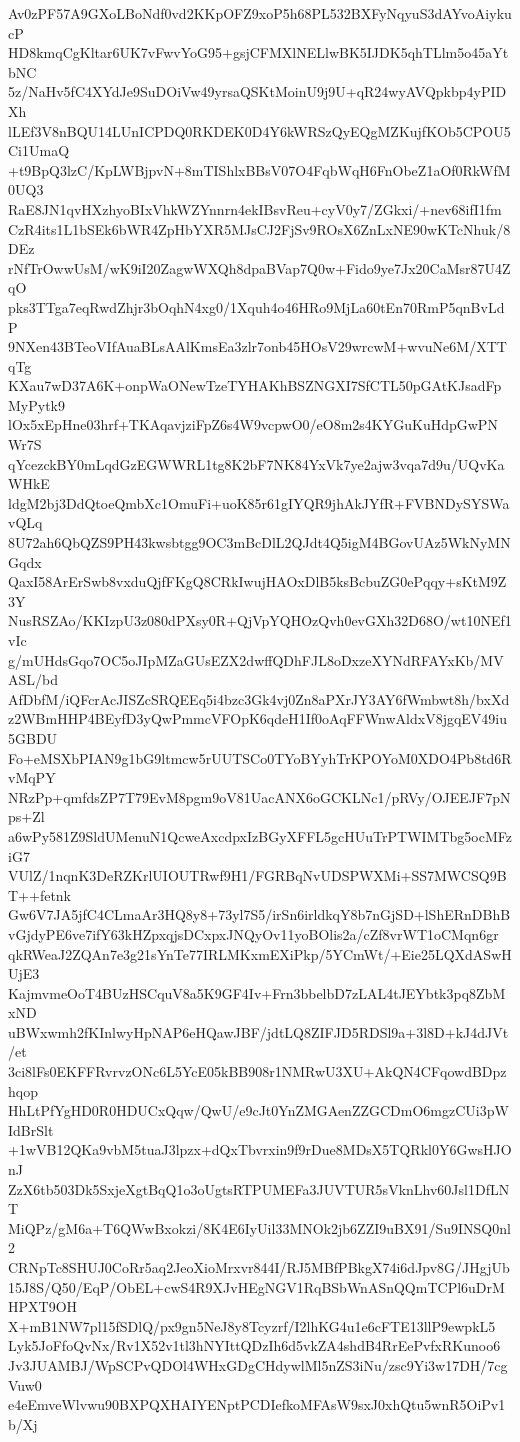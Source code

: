 Av0zPF57A9GXoLBoNdf0vd2KKpOFZ9xoP5h68PL532BXFyNqyuS3dAYvoAiykucP
HD8kmqCgKltar6UK7vFwvYoG95+gsjCFMXlNELlwBK5IJDK5qhTLlm5o45aYtbNC
5z/NaHv5fC4XYdJe9SuDOiVw49yrsaQSKtMoinU9j9U+qR24wyAVQpkbp4yPIDXh
lLEf3V8nBQU14LUnICPDQ0RKDEK0D4Y6kWRSzQyEQgMZKujfKOb5CPOU5Ci1UmaQ
+t9BpQ3lzC/KpLWBjpvN+8mTIShlxBBsV07O4FqbWqH6FnObeZ1aOf0RkWfM0UQ3
RaE8JN1qvHXzhyoBIxVhkWZYnnrn4ekIBsvReu+cyV0y7/ZGkxi/+nev68ifI1fm
CzR4its1L1bSEk6bWR4ZpHbYXR5MJsCJ2FjSv9ROsX6ZnLxNE90wKTcNhuk/8DEz
rNfTrOwwUsM/wK9iI20ZagwWXQh8dpaBVap7Q0w+Fido9ye7Jx20CaMsr87U4ZqO
pks3TTga7eqRwdZhjr3bOqhN4xg0/1Xquh4o46HRo9MjLa60tEn70RmP5qnBvLdP
9NXen43BTeoVIfAuaBLsAAlKmsEa3zlr7onb45HOsV29wrcwM+wvuNe6M/XTTqTg
KXau7wD37A6K+onpWaONewTzeTYHAKhBSZNGXI7SfCTL50pGAtKJsadFpMyPytk9
lOx5xEpHne03hrf+TKAqavjziFpZ6s4W9vcpwO0/eO8m2s4KYGuKuHdpGwPNWr7S
qYcezckBY0mLqdGzEGWWRL1tg8K2bF7NK84YxVk7ye2ajw3vqa7d9u/UQvKaWHkE
ldgM2bj3DdQtoeQmbXc1OmuFi+uoK85r61gIYQR9jhAkJYfR+FVBNDySYSWavQLq
8U72ah6QbQZS9PH43kwsbtgg9OC3mBcDlL2QJdt4Q5igM4BGovUAz5WkNyMNGqdx
QaxI58ArErSwb8vxduQjfFKgQ8CRkIwujHAOxDlB5ksBcbuZG0ePqqy+sKtM9Z3Y
NusRSZAo/KKIzpU3z080dPXsy0R+QjVpYQHOzQvh0evGXh32D68O/wt10NEf1vIc
g/mUHdsGqo7OC5oJIpMZaGUsEZX2dwffQDhFJL8oDxzeXYNdRFAYxKb/MVASL/bd
AfDbfM/iQFcrAcJISZcSRQEEq5i4bzc3Gk4vj0Zn8aPXrJY3AY6fWmbwt8h/bxXd
z2WBmHHP4BEyfD3yQwPmmcVFOpK6qdeH1If0oAqFFWnwAldxV8jgqEV49iu5GBDU
Fo+eMSXbPIAN9g1bG9ltmcw5rUUTSCo0TYoBYyhTrKPOYoM0XDO4Pb8td6RvMqPY
NRzPp+qmfdsZP7T79EvM8pgm9oV81UacANX6oGCKLNc1/pRVy/OJEEJF7pNps+Zl
a6wPy581Z9SldUMenuN1QcweAxcdpxIzBGyXFFL5gcHUuTrPTWIMTbg5ocMFziG7
VUlZ/1nqnK3DeRZKrlUIOUTRwf9H1/FGRBqNvUDSPWXMi+SS7MWCSQ9BT++fetnk
Gw6V7JA5jfC4CLmaAr3HQ8y8+73yl7S5/irSn6irldkqY8b7nGjSD+lShERnDBhB
vGjdyPE6ve7ifY63kHZpxqjsDCxpxJNQyOv11yoBOlis2a/cZf8vrWT1oCMqn6gr
qkRWeaJ2ZQAn7e3g21sYnTe77IRLMKxmEXiPkp/5YCmWt/+Eie25LQXdASwHUjE3
KajmvmeOoT4BUzHSCquV8a5K9GF4Iv+Frn3bbelbD7zLAL4tJEYbtk3pq8ZbMxND
uBWxwmh2fKInlwyHpNAP6eHQawJBF/jdtLQ8ZIFJD5RDSl9a+3l8D+kJ4dJVt/et
3ci8lFs0EKFFRvrvzONc6L5YcE05kBB908r1NMRwU3XU+AkQN4CFqowdBDpzhqop
HhLtPfYgHD0R0HDUCxQqw/QwU/e9cJt0YnZMGAenZZGCDmO6mgzCUi3pWIdBrSlt
+1wVB12QKa9vbM5tuaJ3lpzx+dQxTbvrxin9f9rDue8MDsX5TQRkl0Y6GwsHJOnJ
ZzX6tb503Dk5SxjeXgtBqQ1o3oUgtsRTPUMEFa3JUVTUR5sVknLhv60Jsl1DfLNT
MiQPz/gM6a+T6QWwBxokzi/8K4E6IyUil33MNOk2jb6ZZI9uBX91/Su9INSQ0nl2
CRNpTc8SHUJ0CoRr5aq2JeoXioMrxvr844I/RJ5MBfPBkgX74i6dJpv8G/JHgjUb
15J8S/Q50/EqP/ObEL+cwS4R9XJvHEgNGV1RqBSbWnASnQQmTCPl6uDrMHPXT9OH
X+mB1NW7pl15fSDlQ/px9gn5NeJ8y8Tcyzrf/I2lhKG4u1e6cFTE13llP9ewpkL5
Lyk5JoFfoQvNx/Rv1X52v1tl3hNYIttQDzIh6d5vkZA4shdB4RrEePvfxRKunoo6
Jv3JUAMBJ/WpSCPvQDOl4WHxGDgCHdywlMl5nZS3iNu/zsc9Yi3w17DH/7cgVuw0
e4eEmveWlvwu90BXPQXHAIYENptPCDIefkoMFAsW9sxJ0xhQtu5wnR5OiPv1b/Xj
